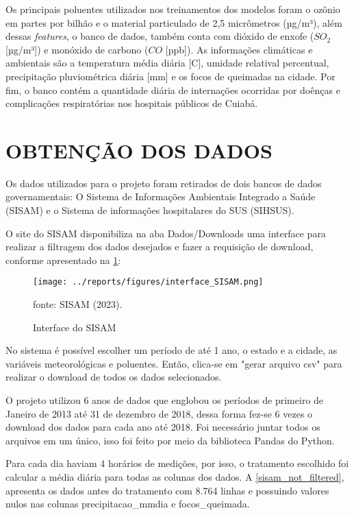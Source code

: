 \documentclass[
  12pt,		%
  a4paper,	%
  openright,%
  oneside,	%
  chapter=TITLE,		%
  section=TITLE,		%
  english,	%
  french,	%
  spanish,	%
  brazil	%
]{abntex2}
\begin{document}
    Os principais poluentes utilizados nos treinamentos dos modelos foram o ozônio em partes por bilhão e
    o material particulado de 2,5 micrômetros (µg/m³), além dessas \textit{features}, o banco de
    dados, também conta com dióxido de enxofe ($SO_2$ [µg/m³]) e monóxido de carbono ($CO$ [ppb]). As informações
    climáticas e ambientais são a temperatura média diária [\textdegree C], umidade relatival percentual, 
     precipitação pluviométrica diária [mm] e os focos de queimadas na cidade. Por fim, o banco contém 
    a quantidade diária de internações ocorridas por doênças e complicações respiratórias nos hospitais públicos
    de Cuiabá. 

    \section{OBTENÇÃO DOS DADOS}
    
    Os dados utilizados para o projeto foram retirados de dois bancos de dados governamentais: O 
    Sistema de Informações Ambientais Integrado a Saúde (SISAM) e o Sistema de informações hospitalares do SUS (SIHSUS).

    O site do SISAM disponibiliza na aba Dados/Downloads uma interface para realizar a filtragem dos dados desejados e 
    fazer a requisição de download, conforme apresentado na \ref*{int_sisam}:

    \begin{figure}[ht]
        \centering
        \caption{Interface do SISAM}
        \texttt{[image: ../reports/figures/interface\_SISAM.png]}
        \label{int_sisam}
        \par
        {\small fonte: SISAM (2023).}
    \end{figure}

    No sistema é possível escolher um período de até 1 ano, o estado e a cidade, as variáveis 
    meteorológicas e poluentes. Então, clica-se em "gerar arquivo csv" para realizar o download de todos os
    dados selecionados.

    O projeto utilizou 6 anos de dados que englobou os períodos de primeiro de Janeiro de 2013 
    até 31 de dezembro de 2018, dessa forma fez-se 6 vezes o download dos dados para cada ano até 2018.
    Foi necessário juntar todos os arquivos em um único, isso foi feito por meio da biblioteca Pandas do Python.

    Para cada dia haviam 4 horários de medições, por isso, o tratamento escolhido foi 
    calcular a média diária para todas as colunas dos dados. 
    A \ref*{sisam_not_filtered}, apresenta os dados antes do tratamento com 8.764 linhas 
    e possuindo valores nulos nas colunas precipitacao\_mmdia e focos\_queimada.
    
\end{document}
